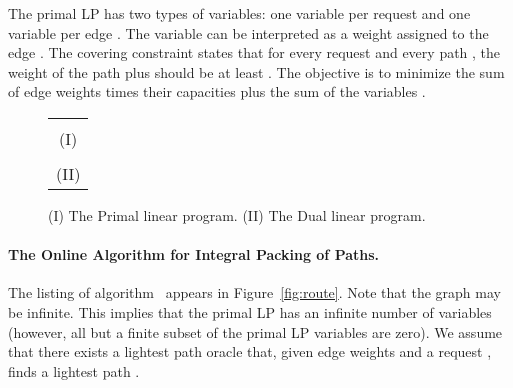 \documentclass[11pt]{article}
\newcommand{\route}{\text{\sc{ipp}}}
\newenvironment{proof sketch}[1]{\noindent {\emph{Proof sketch of #1:}}}{\hfill \qed}
\begin{document}
The primal LP has two types of variables: one variable  per request  and
one variable  per edge . The variable  can be interpreted as a weight
assigned to the edge . The covering constraint states that for every request 
and every path , the weight of the path  plus  should be at least
. The objective is to minimize the sum of edge weights times their capacities plus
the sum of the variables .



\begin{figure}
\centering
  \begin{tabular}{c}
  \centerline{\fbox{\begin{minipage}{0.7\textwidth}
\begin{center}
        
 \end{center}
\end{minipage}}}
    \\ (I) \\
    \centerline{\fbox{\begin{minipage}{0.7\textwidth}
\begin{center}
        
\end{center}
\end{minipage}}}
 \\ (II) \\
  \end{tabular}
  \caption{
(I) The Primal linear program.
(II) The Dual linear program.}
   \label{fig:LP}
\end{figure}


\paragraph{The Online Algorithm for Integral Packing of Paths.}
The listing of algorithm \route\ appears in
Figure~\ref{fig:route}.  Note that the graph  may
be infinite.  This implies that the primal LP has an
infinite number of variables (however, all but a finite
subset of the primal LP variables are zero).  We assume
that there exists a lightest path oracle that, given edge
weights  and a request , finds a lightest path .
\end{document}
